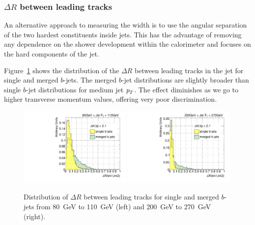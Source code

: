\subsubsection{$\Delta R$ between leading tracks}  

An alternative approach to measuring the width is to use the angular separation of the two hardest constituents inside jets. This has the advantage of removing any dependence on the shower development within the calorimeter and focuses on the hard components of the jet. 

Figure~\ref{fig:drtrk12singlemerged} shows the distribution of the $\Delta R$ between leading tracks in the jet for single and merged $b$-jets. The merged $b$-jet distributions are slightly broader than single $b$-jet distributions for medium jet ${\emph{p}_{T}}$. The effect diminishes as we go to higher transverse momentum values, offering very poor discrimination.

\begin{figure}[tp]
\centering
\includegraphics[width=0.49\textwidth]{FIGS/VarsSingleMerged/DRtrk12080.pdf}
\includegraphics[width=0.49\textwidth]{FIGS/VarsSingleMerged/DRtrk12200.pdf}
\caption{Distribution of $\Delta R$ between leading tracks for single and merged $b$-jets from 80~GeV to 110~GeV (left) and 200~GeV to 270~GeV (right).}
\label{fig:drtrk12singlemerged}
\end{figure}


